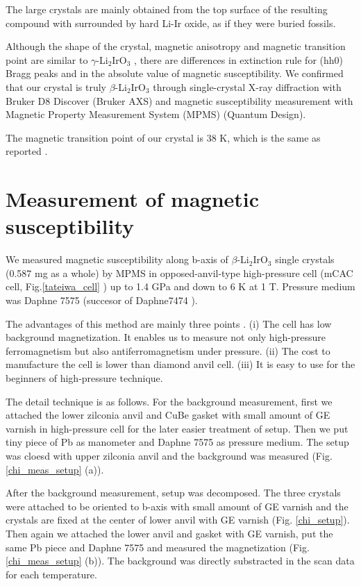 The large crystals are mainly obtained from the top surface of the resulting compound with surrounded by hard Li-Ir oxide,
as if they were buried fossils.

Although the shape of the crystal, magnetic anisotropy and magnetic transition point are similar to $\gamma$-Li$_2$IrO$_3$ \cite{modic2014realization},
there are differences in extinction rule for (hh0) Bragg peaks and in the absolute value of magnetic susceptibility.
We confirmed that our crystal is truly $\beta$-Li$_2$IrO$_3$ through single-crystal X-ray diffraction with Bruker D8 Discover (Bruker AXS)
and magnetic susceptibility measurement with Magnetic Property Measurement System (MPMS) (Quantum Design).

The magnetic transition point of our crystal is 38 K, which is the same as reported \cite{ruiz2017correlated}.

\section{Measurement of magnetic susceptibility}
We measured magnetic susceptibility along b-axis of $\beta$-Li$_2$IrO$_3$ single crystals (0.587 mg as a whole)
by MPMS in opposed-anvil-type high-pressure cell (mCAC cell, Fig.\ref{tateiwa_cell} \cite{Tateiwa2011}) up to 1.4 GPa and down to 6 K at 1 T.
Pressure medium was Daphne 7575 (succesor of Daphne7474 \cite{Murata2008}).

The advantages of this method are mainly three points \cite{Tateiwa2011}.
(i) The cell has low background magnetization.
It enables us to measure not only high-pressure ferromagnetism but also antiferromagnetism under pressure.
(ii) The cost to manufacture the cell is lower than diamond anvil cell.
(iii) It is easy to use for the beginners of high-pressure technique.

The detail technique is as follows.
For the background measurement, first we attached the lower zilconia anvil and CuBe gasket
with small amount of GE varnish in high-pressure cell for the later easier treatment of setup.
Then we put tiny piece of Pb as manometer and Daphne 7575 as pressure medium.
The setup was cloesd with upper zilconia anvil and the background was measured (Fig.\ref{chi_meas_setup} (a)).

After the background measurement, setup was decomposed.
The three crystals were attached to be oriented to b-axis with small amount of GE varnish and the crystals are fixed at the center of lower anvil with GE varnish
(Fig. \ref{chi_setup}).
Then again we attached the lower anvil and gasket with GE varnish, put the same Pb piece and Daphne 7575 and measured the magnetization (Fig.\ref{chi_meas_setup} (b)).
The background was directly substracted in the scan data for each temperature.

